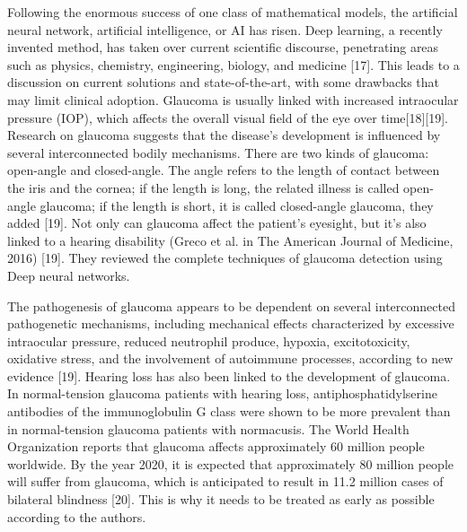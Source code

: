 \vspace{5mm}
\noindent Following the enormous success of one class of mathematical models, the artificial neural network, artificial intelligence, or AI has risen. Deep learning, a recently invented method, has taken over current scientific discourse, penetrating areas such as physics, chemistry, engineering, biology, and medicine [17]. This leads to a discussion on current solutions and state-of-the-art, with some drawbacks that may limit clinical adoption. Glaucoma is usually linked with increased intraocular pressure (IOP), which affects the overall visual field of the eye over time[18][19]. Research on glaucoma suggests that the disease's development is influenced by several interconnected bodily mechanisms. There are two kinds of glaucoma: open-angle and closed-angle. The angle refers to the length of contact between the iris and the cornea; if the length is long, the related illness is called open-angle glaucoma; if the length is short, it is called closed-angle glaucoma, they added [19]. Not only can glaucoma affect the patient's eyesight, but it's also linked to a hearing disability (Greco et al. in The American Journal of Medicine, 2016) [19]. They reviewed the complete techniques of glaucoma detection using  Deep neural networks.

\vspace{5mm}
\noindent The pathogenesis of glaucoma appears to be dependent on several interconnected pathogenetic mechanisms, including mechanical effects characterized by excessive intraocular pressure, reduced neutrophil produce, hypoxia, excitotoxicity, oxidative stress, and the involvement of autoimmune processes, according to new evidence [19]. Hearing loss has also been linked to the development of glaucoma. In normal-tension glaucoma patients with hearing loss, antiphosphatidylserine antibodies of the immunoglobulin G class were shown to be more prevalent than in normal-tension glaucoma patients with normacusis. The World Health Organization reports that glaucoma affects approximately 60 million people worldwide. By the year 2020, it is expected that approximately 80 million people will suffer from glaucoma, which is anticipated to result in 11.2 million cases of bilateral blindness [20]. This is why it needs to be treated as early as possible according to the authors.

